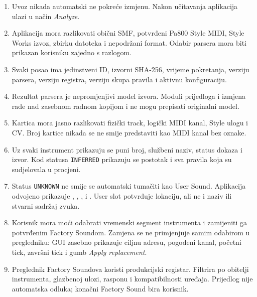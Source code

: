\documentclass[11pt]{article}
\begin{document}
\begin{enumerate}[label=A\arabic*.]
    \item Uvoz nikada automatski ne pokreće izmjenu. Nakon učitavanja aplikacija
    ulazi u način \emph{Analyze}.

    \item Aplikacija mora razlikovati obični SMF, potvrđeni Pa800 Style MIDI,
    Style Works izvoz, zbirku datoteka i nepodržani format. Odabir parsera mora
    biti prikazan korisniku zajedno s razlogom.

    \item Svaki posao ima jedinstveni ID, izvorni SHA-256, vrijeme pokretanja,
    verziju parsera, verziju registra, verziju skupa pravila i aktivnu
    konfiguraciju.

    \item Rezultat parsera je nepromjenjivi model izvora. Moduli prijedloga i
    izmjena rade nad zasebnom radnom kopijom i ne mogu prepisati originalni
    model.

    \item Kartica mora jasno razlikovati fizički track, logički MIDI kanal,
    Style ulogu i CV. Broj kartice nikada se ne smije predstaviti kao MIDI
    kanal bez oznake.

    \item Uz svaki instrument prikazuju se puni broj, službeni naziv, status
    dokaza i izvor. Kod statusa \texttt{INFERRED} prikazuju se postotak i sva
    pravila koja su sudjelovala u procjeni.

    \item Status \texttt{UNKNOWN} ne smije se automatski tumačiti kao User
    Sound. Aplikacija odvojeno prikazuje ,
    , ,  i
    . User slot potvrđuje lokaciju, ali ne i naziv
    ili stvarni sadržaj zvuka.

    \item Korisnik mora moći odabrati vremenski segment instrumenta i zamijeniti
    ga potvrđenim Factory Soundom. Zamjena se ne primjenjuje samim odabirom u
    pregledniku: GUI zasebno prikazuje ciljnu adresu, pogođeni kanal, početni
    tick, završni tick i gumb \emph{Apply replacement}.

    \item Preglednik Factory Soundova koristi produkcijski registar. Filtrira
    po obitelji instrumenta, glazbenoj ulozi, rasponu i kompatibilnosti
    uređaja. Prijedlog nije automatska odluka; konačni Factory Sound bira
    korisnik.


\end{enumerate}
\end{document}

